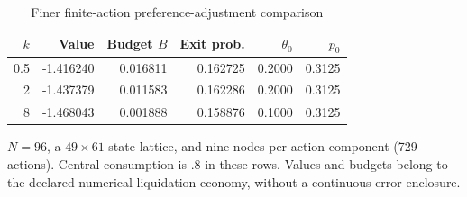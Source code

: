 \begin{table}[htbp]
\centering\small
\caption{Finer finite-action preference-adjustment comparison}\label{r8:tab:cost}
\begin{tabular}{@{}rrrrrr@{}}
\toprule
$k$ & Value & Budget $B$ & Exit prob. & $\theta_0$ & $p_0$ \\
\midrule
0.5 & -1.416240 & 0.016811 & 0.162725 & 0.2000 & 0.3125 \\
2 & -1.437379 & 0.011583 & 0.162286 & 0.2000 & 0.3125 \\
8 & -1.468043 & 0.001888 & 0.158876 & 0.1000 & 0.3125 \\
\bottomrule
\end{tabular}
\par\smallskip\footnotesize $N=96$, a $49\times61$ state lattice, and nine nodes per action component (729 actions). Central consumption is .8 in these rows. Values and budgets belong to the declared numerical liquidation economy, without a continuous error enclosure.
\end{table}
